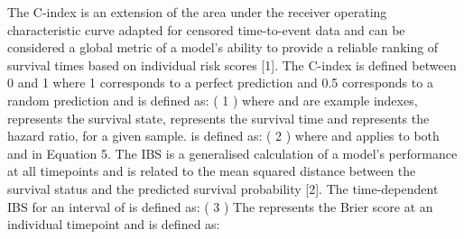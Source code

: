 \documentclass{article}%
\begin{document}
\newline%
%
%
\newline%
\newline%
%
The C{-}index is an extension of the area under the receiver operating characteristic curve adapted for censored time{-}to{-}event data and can be considered a global metric of a model’s ability to provide a reliable ranking of survival times based on individual risk scores {[}1{]}. The C{-}index is defined between 0 and 1 where 1 corresponds to a perfect prediction and 0.5 corresponds to a random prediction and is defined as:%
\newline%
\newline%
%
%
\newline%
\newline%
%
%
\newline%
\newline%
%
( 1 )%
\newline%
\newline%
%
where  and  are example indexes,  represents the survival state,  represents the survival time and  represents the hazard ratio, for a given sample.  is defined as:%
\newline%
\newline%
%
%
\newline%
\newline%
%
%
\newline%
\newline%
%
( 2 )%
\newline%
\newline%
%
where  and  applies to both and  in Equation 5.%
\newline%
\newline%
%
%
\newline%
\newline%
%
The IBS is a generalised calculation of a model’s performance at all timepoints  and is related to the mean squared distance between the survival status and the predicted survival probability {[}2{]}. The time{-}dependent IBS for an interval of  is defined as:%
\newline%
\newline%
%
%
\newline%
\newline%
%
%
\newline%
\newline%
%
( 3 )%
\newline%
\newline%
%
The  represents the Brier score at an individual timepoint and is defined as:%
\end{document}
